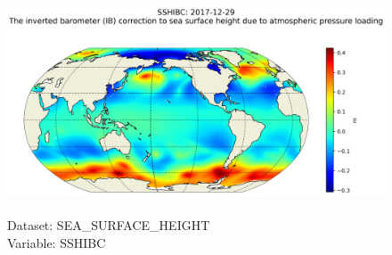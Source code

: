 \begin{figure}[H]
\centering
\includegraphics[scale=0.5]{../images/plots/latlon_plots/Sea_Surface_Height/SSHIBC.png}
\caption{\\Dataset: SEA\_SURFACE\_HEIGHT\\Variable: SSHIBC}
\label{tab:table-SEA_SURFACE_HEIGHT_SSHIBC-Plot}
\end{figure}
\pagebreak
